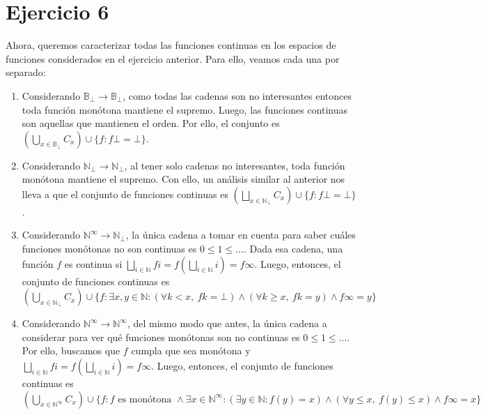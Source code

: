 \documentclass{article}
\newcommand{\N}{\mathbb{N}}
\newcommand{\B}{\mathbb{B}}
\newcommand{\supr}{\bigsqcup\limits}
\begin{document}
\section*{Ejercicio 6}
Ahora, queremos caracterizar todas las funciones continuas en los espacios de funciones considerados en el ejercicio anterior.
Para ello, veamos cada una por separado:
\begin{enumerate}[label=(\alph*)]
	\item Considerando $\B_\bot \to \B_\bot$, como todas las cadenas son no interesantes entonces toda función monótona mantiene el supremo.
	      Luego, las funciones continuas son aquellas que mantienen el orden.
	      Por ello, el conjunto es $\left(\bigcup\limits_{x \in \B_\bot} C_x\right) \cup \{f : f \bot = \bot\}$.

	\item Considerando $\N_\bot \to \N_\bot$, al tener solo cadenas no interesantes, toda función monótona mantiene el supremo.
	      Con ello, un análisis similar al anterior nos lleva a que el conjunto de funciones continuas es $\left(\bigsqcup\limits_{x \in \N_\bot} C_x\right) \cup \{f : f \bot = \bot\}$.

	\item Considerando $\N^\infty \to \N_\bot$, la única cadena a tomar en cuenta para saber cuáles funciones monótonas no son continuas es $0 \leq 1 \leq \dots$.
	      Dada esa cadena, una función $f$ es continua si $\bigsqcup\limits_{i \in \N} f i = f\left(\bigsqcup\limits_{i \in \N} i\right) = f \infty$.
	      Luego, entonces, el conjunto de funciones continuas es $\left(\bigcup\limits_{x \in \N_\bot} C_x\right) \cup \{f : \exists x, y \in \N : (\forall k < x,\ f k = \bot) \land (\forall k \geq x,\ f k = y) \land f \infty = y \}$

	\item Considerando $\N^\infty \to \N^\infty$, del mismo modo que antes, la única cadena a considerar para ver qué funciones monótonas son no continuas es $0 \leq 1 \leq \dots$.
	      Por ello, buscamos que $f$ cumpla que sea monótona y $\supr_{i \in \N} f i = f\left(\supr_{i \in \N} i\right) = f \infty$.
	      Luego, entonces, el conjunto de funciones continuas es $\left(\bigcup\limits_{x \in \N^\infty} C_x\right) \cup \{f : f \text{ es monótona } \land \exists x \in \N^\infty : (\exists y \in \N : f(y) = x) \land (\forall y \leq x,\ f(y) \leq x) \land f \infty = x\}$
\end{enumerate}
\end{document}
